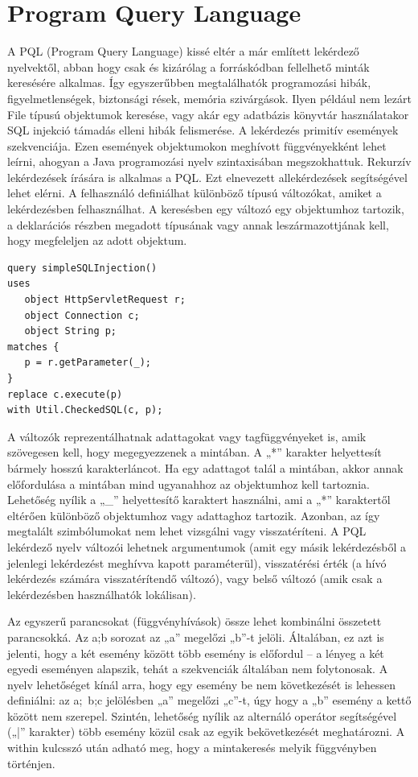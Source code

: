 \documentclass[a4paper,12pt]{report}
\begin{document}
\section{Program Query Language}
\par A PQL (Program Query Language) kissé eltér a már említett lekérdező nyelvektől, abban hogy csak és kizárólag a forráskódban fellelhető minták keresésére alkalmas. Így egyszerűbben megtalálhatók programozási hibák, figyelmetlenségek, biztonsági rések, memória szivárgások. Ilyen például nem lezárt File típusú objektumok keresése, vagy akár egy adatbázis könyvtár használatakor SQL injekció támadás elleni hibák felismerése. A lekérdezés primitív események szekvenciája. Ezen események objektumokon meghívott függvényekként lehet leírni, ahogyan a Java programozási nyelv szintaxisában megszokhattuk. Rekurzív lekérdezések írására is alkalmas a PQL. Ezt elnevezett allekérdezések segítségével lehet elérni. A felhasználó definiálhat különböző típusú változókat, amiket a lekérdezésben felhasználhat. A keresésben egy változó egy objektumhoz tartozik, a deklarációs részben megadott típusának vagy annak leszármazottjának kell, hogy megfeleljen az adott objektum.
\begin{verbatim}
query simpleSQLInjection()
uses
   object HttpServletRequest r;
   object Connection c;
   object String p;
matches { 
   p = r.getParameter(_); 
}
replace c.execute(p)
with Util.CheckedSQL(c, p);
\end{verbatim} 
\par A változók reprezentálhatnak adattagokat vagy tagfüggvényeket is, amik szövegesen kell, hogy megegyezzenek a mintában. A „*” karakter helyettesít bármely hosszú karakterláncot. Ha egy adattagot talál a mintában, akkor annak előfordulása a mintában mind ugyanahhoz az objektumhoz kell tartoznia. Lehetőség nyílik a „\_” helyettesítő karaktert használni, ami a „*” karaktertől eltérően különböző objektumhoz vagy adattaghoz tartozik. Azonban, az így megtalált szimbólumokat nem lehet vizsgálni vagy visszatéríteni. A PQL lekérdező nyelv változói lehetnek argumentumok (amit egy másik lekérdezésből a jelenlegi lekérdezést meghívva kapott paraméterül), visszatérési érték (a hívó lekérdezés számára visszatérítendő változó), vagy belső változó (amik csak a lekérdezésben használhatók lokálisan).
\par Az egyszerű parancsokat (függvényhívások) össze lehet kombinálni összetett parancsokká. Az a;b sorozat az „a” megelőzi „b”-t jelöli. Általában, ez azt is jelenti, hogy a két esemény között több esemény is előfordul – a lényeg a két egyedi eseményen alapszik, tehát a szekvenciák általában nem folytonosak. A nyelv lehetőséget kínál arra, hogy egy esemény be nem következését is lehessen definiálni: az a;~b;c jelölésben „a” megelőzi „c”-t, úgy hogy a „b” esemény a kettő között nem szerepel. Szintén, lehetőség nyílik az alternáló operátor segítségével („|” karakter) több esemény közül csak az egyik bekövetkezését meghatározni. A within kulcsszó után adható meg, hogy a mintakeresés melyik függvényben történjen.
\end{document}
